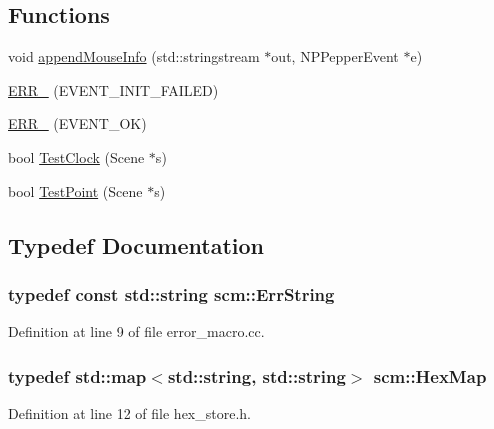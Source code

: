 \subsection*{Functions}
\begin{DoxyCompactItemize}
\item 
void \hyperlink{namespacescm_acb8f6b2f25d7c07de183bb8b8d518510}{appendMouseInfo} (std::stringstream $\ast$out, NPPepperEvent $\ast$e)
\item 
\hyperlink{namespacescm_adbb7998a18f4d5b55f2d9af9146e27e9}{ERR\_\-} (EVENT\_\-INIT\_\-FAILED)
\item 
\hyperlink{namespacescm_af343ae95ed75977e4da042874b9edacc}{ERR\_\-} (EVENT\_\-OK)
\item 
bool \hyperlink{namespacescm_a2f933647227de09b34772f194e579a63}{TestClock} (Scene $\ast$s)
\item 
bool \hyperlink{namespacescm_aca67b9b84fd6253da0c69b4c521e6bc6}{TestPoint} (Scene $\ast$s)
\end{DoxyCompactItemize}


\subsection{Typedef Documentation}
\hypertarget{namespacescm_a13a6ecf77ceb7b5b3a38e0fada54aa99}{
\subsubsection[{ErrString}]{\setlength{\rightskip}{0pt plus 5cm}typedef const std::string {\bf scm::ErrString}}}
\label{namespacescm_a13a6ecf77ceb7b5b3a38e0fada54aa99}


Definition at line 9 of file error\_\-macro.cc.

\hypertarget{namespacescm_a4d40b517d9d5d1165028e138a05ef06d}{
\subsubsection[{HexMap}]{\setlength{\rightskip}{0pt plus 5cm}typedef std::map$<$std::string, std::string$>$ {\bf scm::HexMap}}}
\label{namespacescm_a4d40b517d9d5d1165028e138a05ef06d}


Definition at line 12 of file hex\_\-store.h.



